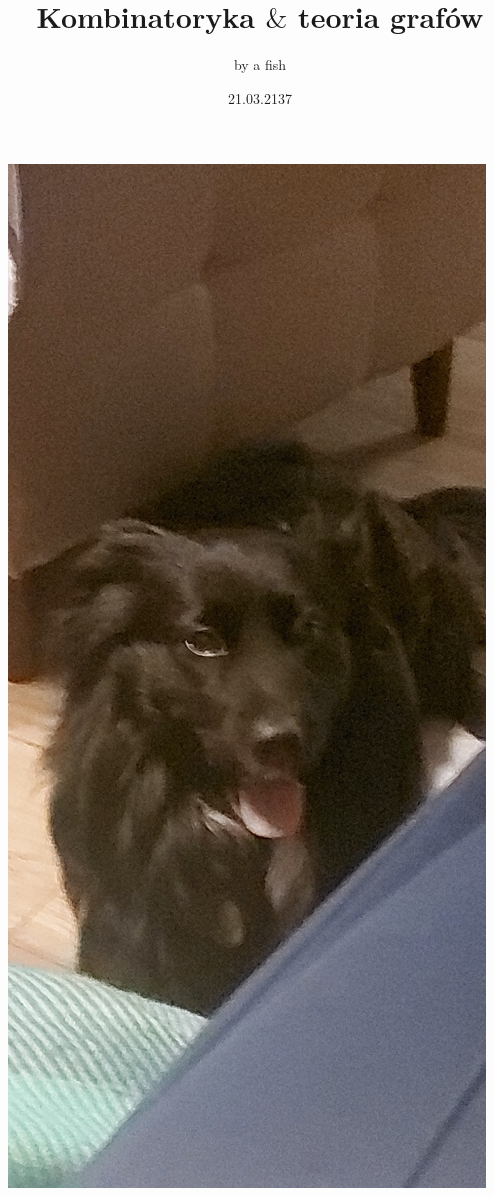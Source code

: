 \documentclass{article}[13pt]
\title {Kombinatoryka $\&$ teoria grafów}
\author{by a fish}
\date {21.03.2137}
\begin{document}
\maketitle

\newpage

\begin{center}
    \includegraphics[height=\textheight]{blep.jpg}
\end{center}
\end{document}
